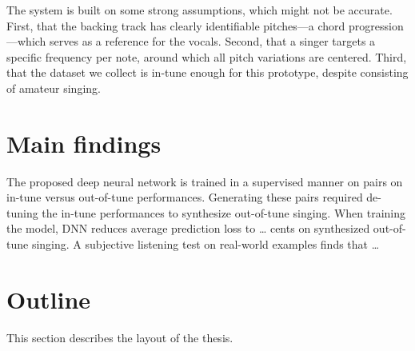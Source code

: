 The system is built on some strong assumptions, which might not be accurate. First, that the backing track has clearly identifiable pitches---a chord progression---which serves as a reference for the vocals. Second, that a singer targets a specific frequency per note, around which all pitch variations are centered. Third, that the dataset we collect is in-tune enough for this prototype, despite consisting of amateur singing. %
\section{Main findings}
The proposed deep neural network is trained in a supervised manner on pairs on in-tune versus out-of-tune performances. Generating these pairs required de-tuning the in-tune performances to synthesize out-of-tune singing. When training the model, DNN reduces average prediction loss to … cents on synthesized out-of-tune singing. A subjective listening test on real-world examples finds that … 

\section{Outline}
This section describes the layout of the thesis.
